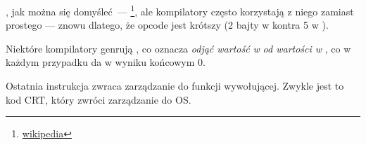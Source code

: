 
\XOR, jak można się domyśleć~--- \footnote{\href{http://go.yurichev.com/17118}{wikipedia}}, ale kompilatory często korzystają z niego zamiast prostego
 --- znowu dlatego, że opcode jest krótszy (2 bajty w \XOR kontra 5 w \MOV).

Niektóre kompilatory genrują , co oznacza \emph{odjąć wartość w} \EAX \emph{od wartości w }\EAX, co w każdym przypadku da w wyniku końcowym 0.

Ostatnia instrukcja \RET zwraca zarządzanie do funkcji wywołującej. Zwykle jest to kod \CCpp \ac{CRT}, który zwróci zarządzanie do \ac{OS}.


